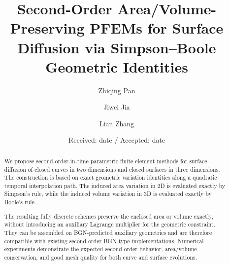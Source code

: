 \documentclass[smallextended]{svjour3}
\numberwithin{equation}{section}
\begin{document}
	\title{Second-Order Area/Volume-Preserving PFEMs for Surface Diffusion via Simpson--Boole Geometric Identities}
	\author{ Zhiqing Pan  \and 
		Jiwei Jia \and Lian Zhang
	}
	\date{Received: date / Accepted: date}
	\maketitle

\begin{abstract}
	We propose second-order-in-time parametric finite element methods for surface diffusion of closed curves in two dimensions and closed surfaces in three dimensions. The construction is based on exact geometric variation identities along a quadratic temporal interpolation path. The induced area variation in 2D is evaluated exactly by Simpson's rule, while the induced volume variation in 3D is evaluated exactly by Boole's rule.
	
	The resulting fully discrete schemes preserve the enclosed area or volume exactly, without introducing an auxiliary Lagrange multiplier for the geometric constraint. They can be assembled on BGN-predicted auxiliary geometries and are therefore compatible with existing second-order BGN-type implementations. Numerical experiments demonstrate the expected second-order behavior, area/volume conservation, and good mesh quality for both curve and surface evolutions.
	
\end{abstract}
	
\end{document}

